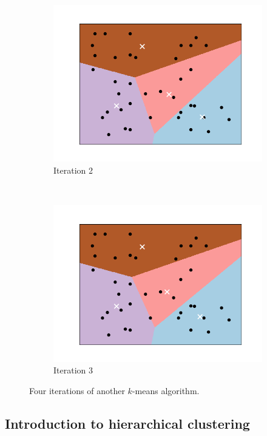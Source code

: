 \documentclass[a4paper, 12pt]{article}
\numberwithin{equation}{section}
\numberwithin{figure}{section}
\theoremstyle{definition}
\begin{document}
\begin{figure}[t]
\begin{subfigure}[b]{0.49\textwidth}
		\centering 
		\includegraphics[scale=0.4]{graphics/k_means_iter2_alt.png}
		\vspace{-0.75em}
		\caption{Iteration 2}
	\end{subfigure}~%
	\begin{subfigure}[b]{0.49\textwidth}
		\centering 
		\includegraphics[scale=0.4]{graphics/k_means_iter3_alt.png}
		\vspace{-0.75em}
		\caption{Iteration 3}
	\end{subfigure}
	\caption{Four iterations of another $k$-means algorithm.}
	\label{fig:4-means-iterations-alt}
\end{figure}

\subsection{Introduction to hierarchical clustering}
\end{document}

